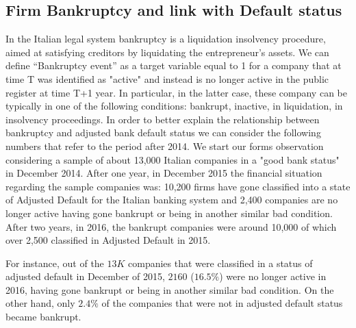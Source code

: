 \subsection{Firm Bankruptcy and link with Default status}
In the Italian legal system bankruptcy is a liquidation insolvency
procedure, aimed at satisfying creditors by liquidating the
entrepreneur's assets. We can define “Bankruptcy event” as a target
variable equal to 1 for a company that at time T was identified as
"active" and instead is no longer active in the public register at time
T+1 year. In particular, in the latter case, these company can be
typically in one of the following conditions: bankrupt, inactive, in
liquidation, in insolvency proceedings. %
In order to better explain the relationship between bankruptcy and adjusted bank default status we can consider the following numbers that refer to the period after 2014.
We start our forms observation considering a sample of about 13,000 Italian companies in a "good bank status" in December 2014.
After one year, in December 2015 the financial situation regarding the sample companies was: 10,200 firms have gone classified into a state of
Adjusted Default for the Italian banking system and 2,400 companies are
no longer active having gone bankrupt or being in another similar bad
condition. After two years, in 2016, the bankrupt companies were around
10,000 of which over 2,500 classified in Adjusted Default in 2015.

For instance, out of the
$13K$ companies that were classified in a status of adjusted default
in December of 2015, $2160$ ($16.5\%$) 
were no longer active in 2016, having gone bankrupt or being in another
similar bad condition.
On the other hand, only $2.4\%$ of the companies that were not in adjusted
default status became bankrupt.










